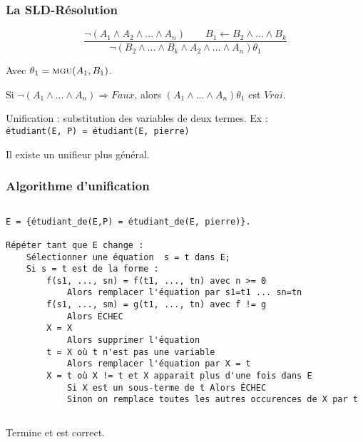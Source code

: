 \documentclass[aspectratio=43]{beamer}
\begin{document}
\begin{frame}
  \frametitle{La SLD-Résolution}
  $$\frac{\neg(A_{1} \wedge A_{2} \wedge ... \wedge A_{n}) \qquad B_{1} \leftarrow B_{2} \wedge ... \wedge B_{k}}{\neg( B_{2} \wedge ... \wedge B_{k} \wedge A_{2} \wedge ... \wedge A_{n})\theta_{1}}$$

  \vspace{1em}
  Avec $\theta_{1} = \textsc{mgu}(A_{1}, B_{1})$.

  \vspace{1em}

  Si $\neg(A_{1} \wedge ... \wedge A_{n}) \Rightarrow Faux$, alors $(A_{1} \wedge ... \wedge A_{n})\theta_{1}$ est $Vrai$.

  \vspace{1em}

  Unification : substitution des variables de deux termes. Ex : \\
  \texttt{étudiant(E, P) = étudiant(E, pierre)}

  \vspace{1em}

  Il existe un unifieur plus général.

\end{frame}


\begin{frame}[fragile]
\frametitle{Algorithme d'unification}
\begin{columns}
\column{\dimexpr\paperwidth-30pt}
\begin{Verbatim}[fontsize=\footnotesize]
E = {étudiant_de(E,P) = étudiant_de(E, pierre)}.

Répéter tant que E change :
    Sélectionner une équation  s = t dans E;
    Si s = t est de la forme :
        f(s1, ..., sn) = f(t1, ..., tn) avec n >= 0
            Alors remplacer l'équation par s1=t1 ... sn=tn
        f(s1, ..., sm) = g(t1, ..., tn) avec f != g
            Alors ÉCHEC
        X = X
            Alors supprimer l'équation
        t = X où t n'est pas une variable
            Alors remplacer l'équation par X = t
        X = t où X != t et X apparait plus d'une fois dans E
            Si X est un sous-terme de t Alors ÉCHEC
            Sinon on remplace toutes les autres occurences de X par t
\end{Verbatim}
\end{columns}

\vspace{1em}

Termine et est correct.
\end{frame}
\end{document}
